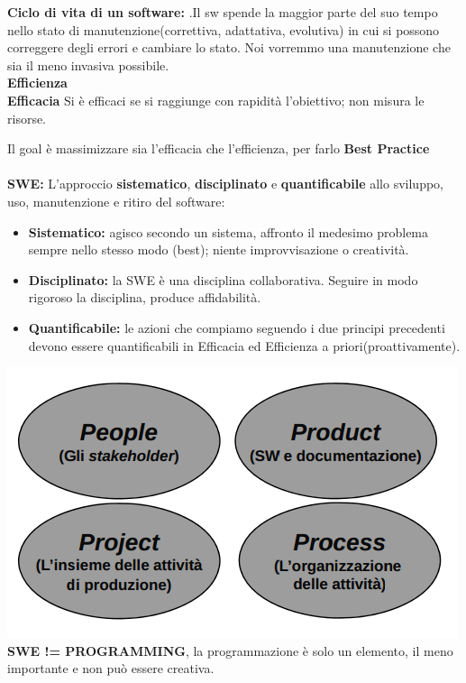 \textbf{Ciclo di vita di un software:} .Il sw spende la maggior parte del suo tempo nello stato di manutenzione(correttiva, adattativa, evolutiva) in cui si possono correggere degli errori e cambiare lo stato. Noi vorremmo una manutenzione che sia il meno invasiva possibile.\\

\textbf{Efficienza}	\\

\textbf{Efficacia} Si è efficaci se si raggiunge con rapidità l'obiettivo; non misura le risorse.

Il goal è massimizzare sia l'efficacia che l'efficienza, per farlo
\textbf{Best Practice }\\
\\

\textbf{SWE:} L'approccio \textbf{sistematico}, \textbf{disciplinato} e \textbf{quantificabile} allo sviluppo, uso, manutenzione e ritiro del software:

\begin{itemize}
	\item \textbf{Sistematico:} agisco secondo un sistema, affronto il medesimo problema sempre nello stesso modo (best); niente improvvisazione o creatività.
	\item \textbf{Disciplinato:} la SWE è una disciplina collaborativa. Seguire in modo rigoroso la disciplina, produce affidabilità.
	\item \textbf{Quantificabile:} le azioni che compiamo seguendo i due principi precedenti devono essere quantificabili in Efficacia ed Efficienza a priori(proattivamente).
\end{itemize}


\includegraphics[width=0.75\columnwidth]{img1} %
\\

\textbf{SWE != PROGRAMMING}, la programmazione è solo un elemento, il meno importante e non può essere creativa.

